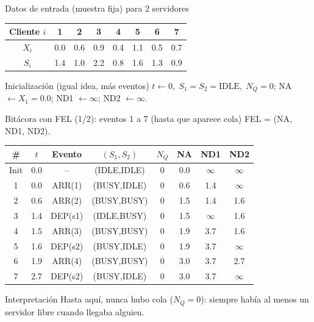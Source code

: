 \documentclass[aspectratio=1610, 9pt]{beamer}
\begin{document}
\begin{frame}{Datos de entrada (muestra fija) para 2 servidores}
\small
\setlength{\tabcolsep}{5pt}
\renewcommand{\arraystretch}{1.18}
\begin{table}
\centering
\scriptsize
\begin{tabular}{@{}cccccccc@{}}
\toprule
Cliente $i$ & 1 & 2 & 3 & 4 & 5 & 6 & 7\\
\midrule
$X_i$ & 0.0 & 0.6 & 0.9 & 0.4 & 1.1 & 0.5 & 0.7\\
$S_i$ & 1.4 & 1.0 & 2.2 & 0.8 & 1.6 & 1.3 & 0.9\\
\bottomrule
\end{tabular}
\end{table}

\vspace{2pt}
\begin{block}{Inicialización (igual idea, más eventos)}
$t\leftarrow 0,\; S_1=S_2=\text{IDLE},\; N_Q=0$;  
NA $\leftarrow X_1=0.0$; ND1 $\leftarrow\infty$; ND2 $\leftarrow\infty$.
\end{block}
\end{frame}

\begin{frame}{Bitácora con FEL (1/2): eventos 1 a 7 (hasta que aparece cola)}
\small
FEL = (NA, ND1, ND2).

\vspace{2pt}
\setlength{\tabcolsep}{3.6pt}
\renewcommand{\arraystretch}{1.12}
\begin{table}
\centering
\scriptsize
\begin{tabular}{@{}c c c c c c c c@{}}
\toprule
\# & $t$ & Evento & $(S_1,S_2)$ & $N_Q$ & NA & ND1 & ND2\\
\midrule
Init & 0.0 & -- & (IDLE,IDLE) & 0 & 0.0 & $\infty$ & $\infty$\\
1 & 0.0 & ARR(1) & (BUSY,IDLE) & 0 & 0.6 & 1.4 & $\infty$\\
2 & 0.6 & ARR(2) & (BUSY,BUSY) & 0 & 1.5 & 1.4 & 1.6\\
3 & 1.4 & DEP(s1) & (IDLE,BUSY) & 0 & 1.5 & $\infty$ & 1.6\\
4 & 1.5 & ARR(3) & (BUSY,BUSY) & 0 & 1.9 & 3.7 & 1.6\\
5 & 1.6 & DEP(s2) & (BUSY,IDLE) & 0 & 1.9 & 3.7 & $\infty$\\
6 & 1.9 & ARR(4) & (BUSY,BUSY) & 0 & 3.0 & 3.7 & 2.7\\
7 & 2.7 & DEP(s2) & (BUSY,IDLE) & 0 & 3.0 & 3.7 & $\infty$\\
\bottomrule
\end{tabular}
\end{table}

\vspace{4pt}
\begin{block}{Interpretación}
Hasta aquí, nunca hubo cola ($N_Q=0$): siempre había al menos un servidor libre cuando llegaba alguien.
\end{block}
\end{frame}
\end{document}

